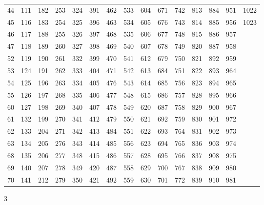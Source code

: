 \documentclass{assignment}
\begin{document}
\begin{tabular}{r r r r r r r r r r r r r r r}
44 & 111 & 182 & 253 & 324 & 391 & 462 & 533 & 604 & 671 & 742 & 813 & 884 & 951 & 1022 \\
45 & 116 & 183 & 254 & 325 & 396 & 463 & 534 & 605 & 676 & 743 & 814 & 885 & 956 & 1023 \\
46 & 117 & 188 & 255 & 326 & 397 & 468 & 535 & 606 & 677 & 748 & 815 & 886 & 957 \\
47 & 118 & 189 & 260 & 327 & 398 & 469 & 540 & 607 & 678 & 749 & 820 & 887 & 958 \\
52 & 119 & 190 & 261 & 332 & 399 & 470 & 541 & 612 & 679 & 750 & 821 & 892 & 959 \\
53 & 124 & 191 & 262 & 333 & 404 & 471 & 542 & 613 & 684 & 751 & 822 & 893 & 964 \\
54 & 125 & 196 & 263 & 334 & 405 & 476 & 543 & 614 & 685 & 756 & 823 & 894 & 965 \\
55 & 126 & 197 & 268 & 335 & 406 & 477 & 548 & 615 & 686 & 757 & 828 & 895 & 966 \\
60 & 127 & 198 & 269 & 340 & 407 & 478 & 549 & 620 & 687 & 758 & 829 & 900 & 967 \\
61 & 132 & 199 & 270 & 341 & 412 & 479 & 550 & 621 & 692 & 759 & 830 & 901 & 972 \\
62 & 133 & 204 & 271 & 342 & 413 & 484 & 551 & 622 & 693 & 764 & 831 & 902 & 973 \\
63 & 134 & 205 & 276 & 343 & 414 & 485 & 556 & 623 & 694 & 765 & 836 & 903 & 974 \\
68 & 135 & 206 & 277 & 348 & 415 & 486 & 557 & 628 & 695 & 766 & 837 & 908 & 975 \\
69 & 140 & 207 & 278 & 349 & 420 & 487 & 558 & 629 & 700 & 767 & 838 & 909 & 980 \\
70 & 141 & 212 & 279 & 350 & 421 & 492 & 559 & 630 & 701 & 772 & 839 & 910 & 981 \\
\end{tabular}
\newpage


3\\
\\
\end{document}
